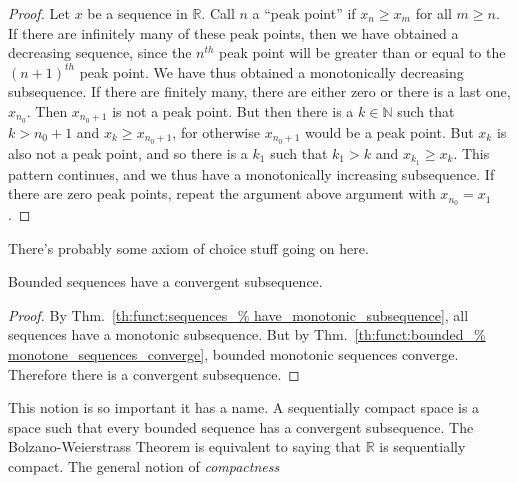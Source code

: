 \documentclass[crop=false,class=book,oneside]{standalone}
\begin{document}
            \begin{proof}
                Let $x$ be a sequence in $\mathbb{R}$.
                Call $n$ a ``peak point'' if
                $x_{n}\geq{x_{m}}$ for all
                ${m}\geq{n}$. If there are infinitely many
                of these peak points, then we have obtained
                a decreasing sequence, since the $n^{th}$
                peak point will be greater than or equal to
                the $(n+1)^{th}$ peak point.
                We have thus obtained
                a monotonically decreasing subsequence.
                If there are finitely many,
                there are either zero or there is a last one,
                $x_{n_{0}}$. Then $x_{n_{0}+1}$ is not a
                peak point. But then there is a
                $k\in\mathbb{N}$ such that $k>n_{0}+1$ and
                $x_{k}\geq{x_{n_{0}+1}}$, for otherwise
                $x_{n_{0}+1}$ would be a peak point. But
                $x_{k}$ is also not a peak point, and so
                there is a $k_{1}$ such that $k_{1}>k$ and
                $x_{k_{1}}\geq{x_{k}}$. This pattern
                continues, and we thus have a monotonically
                increasing subsequence. If there are zero
                peak points, repeat the argument above
                argument with $x_{n_{0}}=x_{1}$.
            \end{proof}
            There's probably some axiom of choice stuff
            going on here.
            \begin{theorem}
                    Bounded sequences have a
                    convergent subsequence.
                \end{theorem}
            \begin{proof}
                By Thm.~\ref{th:funct:sequences_%
                             have_monotonic_subsequence},
                all sequences have a monotonic subsequence.
                But by Thm.~\ref{th:funct:bounded_%
                                 monotone_sequences_converge},
                bounded monotonic sequences converge.
                Therefore there is a convergent subsequence.
            \end{proof}
            This notion is so important it has a name.
            A sequentially
            compact space is a space such that every bounded
            sequence has a convergent subsequence. The
            Bolzano-Weierstrass Theorem is equivalent
            to saying that $\mathbb{R}$ is sequentially
            compact. The general notion of \textit{compactness}
\end{document}
